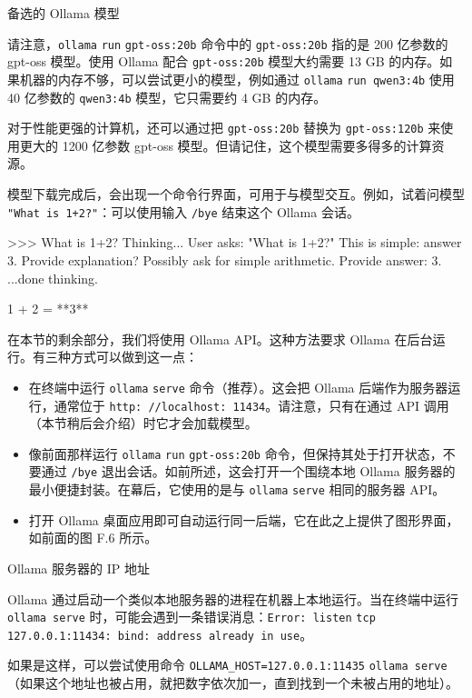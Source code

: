 \begin{mySidebar}{备选的 Ollama 模型}

请注意，\texttt{ollama} \texttt{run} \texttt{gpt-oss:20b} 命令中的 \texttt{gpt-oss:20b} 指的是 200 亿参数的 gpt-oss 模型。使用 Ollama 配合 \texttt{gpt-oss:20b} 模型大约需要 13 GB 的内存。如果机器的内存不够，可以尝试更小的模型，例如通过 \texttt{ollama} \texttt{run qwen3:4b} 使用 40 亿参数的 \texttt{qwen3:4b} 模型，它只需要约 4 GB 的内存。

对于性能更强的计算机，还可以通过把 \texttt{gpt-oss:20b} 替换为 \texttt{gpt-oss:120b} 来使用更大的 1200 亿参数 gpt-oss 模型。但请记住，这个模型需要多得多的计算资源。

\end{mySidebar}

模型下载完成后，会出现一个命令行界面，可用于与模型交互。例如，试着问模型 \texttt{"}\texttt{What is 1+2?}\texttt{"}：可以使用输入 \texttt{/bye} 结束这个 Ollama 会话。

\begin{codebox}
>>> What is 1+2?
Thinking...
User asks: "What is 1+2?" This is simple: answer 3. Provide explanation? Possibly ask for simple
arithmetic. Provide answer: 3.
...done thinking.

1 + 2 = **3**
\end{codebox}

在本节的剩余部分，我们将使用 Ollama API。这种方法要求 Ollama 在后台运行。有三种方式可以做到这一点：

\begin{itemize}
\item 在终端中运行 \texttt{ollama} \texttt{serve} 命令（推荐）。这会把 Ollama 后端作为服务器运行，通常位于 \texttt{http: //localhost: 11434}。请注意，只有在通过 API 调用（本节稍后会介绍）时它才会加载模型。
\item 像前面那样运行 \texttt{ollama} \texttt{run} \texttt{gpt-oss:20b} 命令，但保持其处于打开状态，不要通过 \texttt{/bye} 退出会话。如前所述，这会打开一个围绕本地 Ollama 服务器的最小便捷封装。在幕后，它使用的是与 \texttt{ollama} \texttt{serve} 相同的服务器 API。
\item 打开 Ollama 桌面应用即可自动运行同一后端，它在此之上提供了图形界面，如前面的图 F.6 所示。
\end{itemize}

\begin{mySidebar}{Ollama 服务器的 IP 地址}

Ollama 通过启动一个类似本地服务器的进程在机器上本地运行。当在终端中运行 \texttt{ollama serve} 时，可能会遇到一条错误消息：\texttt{Error: listen} \texttt{tcp 127.0.0.1:11434: bind: address already in use}。

如果是这样，可以尝试使用命令 \texttt{OLLAMA\_HOST=127.0.0.1:11435} \texttt{ollama serve}（如果这个地址也被占用，就把数字依次加一，直到找到一个未被占用的地址）。

\end{mySidebar}

